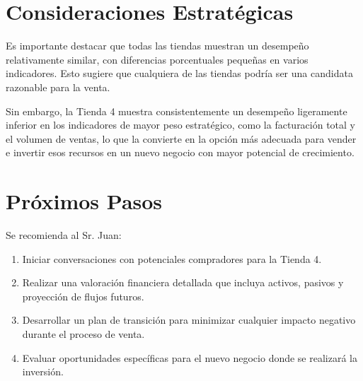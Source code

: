 \documentclass[12pt,a4paper]{report}\usepackage[spanish]{babel}\usepackage[utf8]{inputenc}\usepackage{graphicx}\usepackage{geometry}\usepackage{xcolor}\usepackage{tikz}\usepackage{pgfplots}\usepackage{booktabs}\usepackage{multicol}\usepackage{hyperref}\usepackage{pgf-pie}
\begin{document}
\section{Consideraciones Estratégicas}

Es importante destacar que todas las tiendas muestran un desempeño relativamente similar, con diferencias porcentuales pequeñas en varios indicadores. Esto sugiere que cualquiera de las tiendas podría ser una candidata razonable para la venta.

Sin embargo, la Tienda 4 muestra consistentemente un desempeño ligeramente inferior en los indicadores de mayor peso estratégico, como la facturación total y el volumen de ventas, lo que la convierte en la opción más adecuada para vender e invertir esos recursos en un nuevo negocio con mayor potencial de crecimiento.

\section{Próximos Pasos}

Se recomienda al Sr. Juan:

\begin{enumerate}
    \item Iniciar conversaciones con potenciales compradores para la Tienda 4.
    \item Realizar una valoración financiera detallada que incluya activos, pasivos y proyección de flujos futuros.
    \item Desarrollar un plan de transición para minimizar cualquier impacto negativo durante el proceso de venta.
    \item Evaluar oportunidades específicas para el nuevo negocio donde se realizará la inversión.
\end{enumerate}
\end{document}
